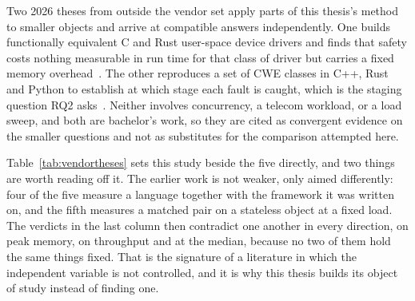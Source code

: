 \documentclass[english,oneside,a4paper,censored,csm,software-track-2020]{HYthesisML}
\begin{document}
Two 2026 theses from outside the vendor set apply parts of this thesis's method to smaller objects
and arrive at compatible answers independently. One builds functionally equivalent C and Rust
user-space device drivers and finds that safety costs nothing measurable in run time for that
class of driver but carries a fixed memory overhead~\cite{sundvisson2026drivers}. The other
reproduces a set of CWE classes in C++, Rust and Python to establish at which stage each fault is
caught, which is the staging question RQ2 asks~\cite{andersson2026stdmemsafety}. Neither involves
concurrency, a telecom workload, or a load sweep, and both are bachelor's work, so they are cited
as convergent evidence on the smaller questions and not as substitutes for the comparison
attempted here.

Table~\ref{tab:vendortheses} sets this study beside the five directly, and two things are worth
reading off it. The earlier work is not weaker, only aimed differently: four of the five measure a
language together with the framework it was written on, and the fifth measures a matched pair on a
stateless object at a fixed load. The verdicts in the last column then contradict one another in
every direction, on peak memory, on throughput and at the median, because no two of them hold the
same things fixed. That is the signature of a literature in which the independent
variable is not controlled, and it is why this thesis builds its object of study instead of
finding one.
\end{document}

